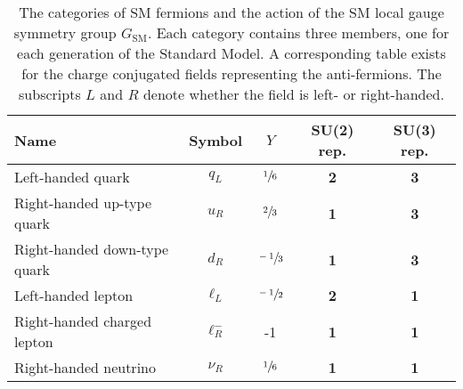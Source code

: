 \begin{table}[htbp]
\centering
\caption{
  The categories of SM fermions and the action of the SM local gauge symmetry group $G_{\text{SM}}$.
  Each category contains three members, one for each generation of the Standard Model.
  A corresponding table exists for the charge conjugated fields representing the anti-fermions.
  The subscripts $L$ and $R$ denote whether the field is left- or right-handed.
}
\label{tab:fermions}
\begin{tabular}{ l|c|c|c|c }
  Name & Symbol & $Y$ & SU(2) rep. & SU(3) rep. \\
  \hline
  \hline
  Left-handed quark & $q_L$ & $\sfrac{1}{6}$ & \textbf{2} & \textbf{3} \\
  Right-handed up-type quark & $u_R$ & $\sfrac{2}{3}$ & \textbf{1} & \textbf{3} \\
  Right-handed down-type quark & $d_R$ & $\sfrac{-1}{3}$ & \textbf{1} & \textbf{3} \\
  \hline
  Left-handed lepton & $\ell_L$ & $\sfrac{-1}{2}$ & \textbf{2} & \textbf{1} \\
  Right-handed charged lepton & $\ell^{-}_R$ & -1 & \textbf{1} & \textbf{1} \\
  Right-handed neutrino & $\nu_R$ & $\sfrac{1}{6}$ & \textbf{1} & \textbf{1} \\
\end{tabular}
\end{table}

